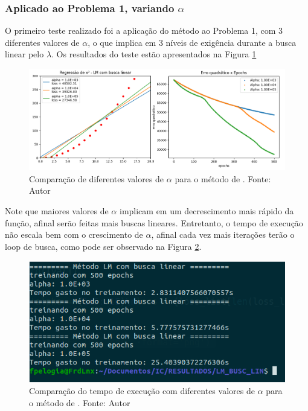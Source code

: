 \documentclass[11pt]{article}
\begin{document}
\subsubsection*{Aplicado ao Problema 1, variando $\alpha$}
O primeiro teste realizado foi a aplicação do método ao Problema 1, com 3 diferentes valores de $\alpha$, o que implica em 3 níveis de exigência durante a busca linear pelo $\lambda$. Os resultados do teste estão apresentados na Figura \ref{LMBL_SQ} 
\begin{figure}[H]
\center
\includegraphics[scale=0.5]{Figuras/REG_lmbl.png}
\caption{Comparação de diferentes valores de $\alpha$ para o método de \cite{bmLS}. Fonte: Autor} 
\label{LMBL_SQ}
\end{figure}
Note que maiores valores de $\alpha$ implicam em um decrescimento mais rápido da função, afinal serão feitas mais buscas lineares. Entretanto, o tempo de execução não escala bem com o crescimento de $\alpha$, afinal cada vez mais iterações terão o loop de busca, como pode ser observado na Figura \ref{LMBL_time}.
\begin{figure}[H]
\center
\includegraphics[scale=0.6]{Figuras/lmbl_square_t.png}
\caption{Comparação do tempo de execução com diferentes valores de $\alpha$ para o método de \cite{bmLS}. Fonte: Autor} 
\label{LMBL_time}
\end{figure}
\end{document}
